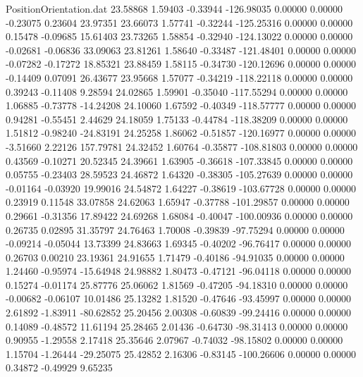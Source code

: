 \begin{filecontents}{PositionOrientation.dat}
  23.58868    1.59403   -0.33944  -126.98035    0.00000    0.00000   -0.23075    0.23604   23.97351
  23.66073    1.57741   -0.32244  -125.25316    0.00000    0.00000    0.15478   -0.09685   15.61403
  23.73265    1.58854   -0.32940  -124.13022    0.00000    0.00000   -0.02681   -0.06836   33.09063
  23.81261    1.58640   -0.33487  -121.48401    0.00000    0.00000   -0.07282   -0.17272   18.85321
  23.88459    1.58115   -0.34730  -120.12696    0.00000    0.00000   -0.14409    0.07091   26.43677
  23.95668    1.57077   -0.34219  -118.22118    0.00000    0.00000    0.39243   -0.11408    9.28594
  24.02865    1.59901   -0.35040  -117.55294    0.00000    0.00000    1.06885   -0.73778  -14.24208
  24.10060    1.67592   -0.40349  -118.57777    0.00000    0.00000    0.94281   -0.55451    2.44629
  24.18059    1.75133   -0.44784  -118.38209    0.00000    0.00000    1.51812   -0.98240  -24.83191
  24.25258    1.86062   -0.51857  -120.16977    0.00000    0.00000   -3.51660    2.22126  157.79781
  24.32452    1.60764   -0.35877  -108.81803    0.00000    0.00000    0.43569   -0.10271   20.52345
  24.39661    1.63905   -0.36618  -107.33845    0.00000    0.00000    0.05755   -0.23403   28.59523
  24.46872    1.64320   -0.38305  -105.27639    0.00000    0.00000   -0.01164   -0.03920   19.99016
  24.54872    1.64227   -0.38619  -103.67728    0.00000    0.00000    0.23919    0.11548   33.07858
  24.62063    1.65947   -0.37788  -101.29857    0.00000    0.00000    0.29661   -0.31356   17.89422
  24.69268    1.68084   -0.40047  -100.00936    0.00000    0.00000    0.26735    0.02895   31.35797
  24.76463    1.70008   -0.39839   -97.75294    0.00000    0.00000   -0.09214   -0.05044   13.73399
  24.83663    1.69345   -0.40202   -96.76417    0.00000    0.00000    0.26703    0.00210   23.19361
  24.91655    1.71479   -0.40186   -94.91035    0.00000    0.00000    1.24460   -0.95974  -15.64948
  24.98882    1.80473   -0.47121   -96.04118    0.00000    0.00000    0.15274   -0.01174   25.87776
  25.06062    1.81569   -0.47205   -94.18310    0.00000    0.00000   -0.00682   -0.06107   10.01486
  25.13282    1.81520   -0.47646   -93.45997    0.00000    0.00000    2.61892   -1.83911  -80.62852
  25.20456    2.00308   -0.60839   -99.24416    0.00000    0.00000    0.14089   -0.48572   11.61194
  25.28465    2.01436   -0.64730   -98.31413    0.00000    0.00000    0.90955   -1.29558    2.17418
  25.35646    2.07967   -0.74032   -98.15802    0.00000    0.00000    1.15704   -1.26444  -29.25075
  25.42852    2.16306   -0.83145  -100.26606    0.00000    0.00000    0.34872   -0.49929    9.65235

\end{filecontents}
